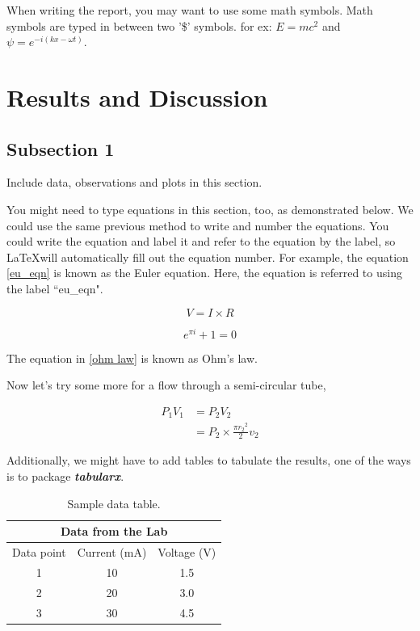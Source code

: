 \documentclass[11pt]{report}	%
\begin{document}
When writing the report, you may want to use some math symbols. Math symbols are typed in between two '\$' symbols. for ex: $E = m c^2$ and $\psi = e^{-i (kx- \omega t)}$.



\newpage %


\chapter{Results and Discussion}

\section{Subsection 1}

Include data, observations and plots in this section.

You might need to type equations in this section, too, as demonstrated below. We could use the same previous method to write and number the equations. You could write the equation and label it and refer to the equation by the label, so \LaTeX will automatically fill out the equation number. For example, the equation \ref{eu_eqn} is known as the Euler equation. Here, the equation is referred to using the label ``eu\_eqn".

\begin{equation} \label{ohm law}
V=I \times R
\end{equation}

\begin{equation} \label{eu_eqn}
e^{\pi i} + 1 = 0
\end{equation}

The equation in \ref{ohm law} is known as Ohm's law.

Now let's try some more for a flow through a semi-circular tube,

\begin{equation} \label{eq3}
\begin{split}
P_1 V_1 & = P_2 V_2 \\
& = P_2 \times \frac{\pi {r_2}^2}{2} v_2
\end{split}
\end{equation}

Additionally, we might have to add tables to tabulate the results, one of the ways is to package \textbf{\textit{tabularx}}.

\begin{table}[h]
\centering
\caption{Sample data table.}
\begin{tabular}{ |c|c|c|  }
 \hline
 \multicolumn{3}{|c|}{Data from the Lab} \\
 \hline
Data point & Current (mA)  & Voltage (V) \\
 \hline
1 & 10 & 1.5\\
2 & 20 & 3.0\\
3 & 30 & 4.5\\
 \hline
\end{tabular}

\end{table}
\end{document}
